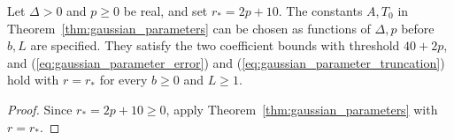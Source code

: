 \begin{corollary}
    \label{cor:gaussian_polynomial_parameters}
    \leanok
    Let $\Delta>0$ and $p\ge0$ be real, and set $r_*=2p+10$.
    The constants $A,T_0$ in Theorem~\ref{thm:gaussian_parameters} can be
    chosen as functions of $\Delta,p$ before $b,L$ are specified. They
    satisfy the two coefficient bounds with threshold $40+2p$, and
    (\ref{eq:gaussian_parameter_error}) and
    (\ref{eq:gaussian_parameter_truncation}) hold with $r=r_*$ for every
    $b\ge0$ and $L\ge1$.
\end{corollary}
\begin{proof}\leanok
    Since $r_*=2p+10\ge0$, apply Theorem~\ref{thm:gaussian_parameters}
    with $r=r_*$.
\end{proof}

